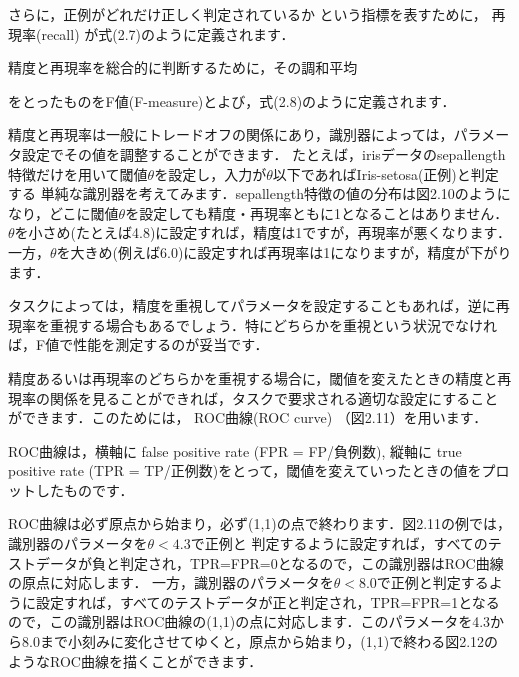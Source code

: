 さらに，正例がどれだけ正しく判定されているか
という指標を表すために，
再現率(recall)
が式(2.7)のように定義されます．


精度と再現率を総合的に判断するために，その調和平均

をとったものをF値(F-measure)とよび，式(2.8)のように定義されます．



精度と再現率は一般にトレードオフの関係にあり，識別器によっては，パラメータ設定でその値を調整することができます．
たとえば，irisデータのsepallength特徴だけを用いて閾値$\theta$を設定し，入力が$\theta$以下であればIris-setosa(正例)と判定する
単純な識別器を考えてみます．sepallength特徴の値の分布は図2.10のようになり，どこに閾値$\theta$を設定しても精度・再現率ともに1となることはありません．$\theta$を小さめ(たとえば4.8)に設定すれば，精度は1ですが，再現率が悪くなります．一方，$\theta$を大きめ(例えば6.0)に設定すれば再現率は1になりますが，精度が下がります．


タスクによっては，精度を重視してパラメータを設定することもあれば，逆に再現率を重視する場合もあるでしょう．特にどちらかを重視という状況でなければ，F値で性能を測定するのが妥当です．


精度あるいは再現率のどちらかを重視する場合に，閾値を変えたときの精度と再現率の関係を見ることができれば，タスクで要求される適切な設定にすることができます．このためには，
ROC曲線(ROC curve)
（図2.11）を用います．


ROC曲線は，横軸に false positive rate (FPR = FP/負例数), 縦軸に true positive rate (TPR = TP/正例数)をとって，閾値を変えていったときの値をプロットしたものです．

ROC曲線は必ず原点から始まり，必ず(1,1)の点で終わります．図2.11の例では，識別器のパラメータを$\theta < 4.3$で正例と
判定するように設定すれば，すべてのテストデータが負と判定され，TPR=FPR=0となるので，この識別器はROC曲線の原点に対応します．
一方，識別器のパラメータを$\theta < 8.0$で正例と判定するように設定すれば，すべてのテストデータが正と判定され，TPR=FPR=1となるので，この識別器はROC曲線の(1,1)の点に対応します．このパラメータを4.3から8.0まで小刻みに変化させてゆくと，原点から始まり，(1,1)で終わる図2.12のようなROC曲線を描くことができます．



